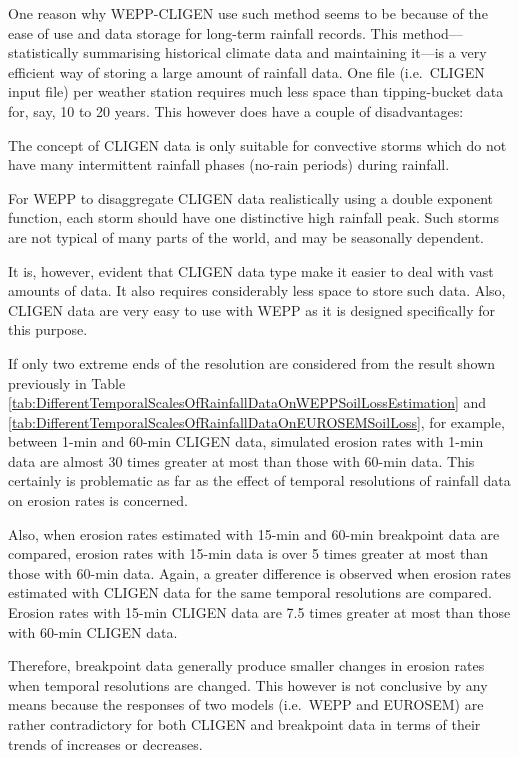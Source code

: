 One reason why WEPP-CLIGEN use such method seems to be because of the ease of
use and data storage for long-term rainfall records. This method---statistically
summarising historical climate data and maintaining it---is a very efficient way
of storing a large amount of rainfall data. One file (i.e.\ CLIGEN input file)
per weather station requires much less space than tipping-bucket data for, say,
10 to 20 years. This however does have a couple of disadvantages:
\begin{enumerate*}
  \item The concept of CLIGEN data is only suitable for convective storms which
do not have many intermittent rainfall phases (no-rain periods) during rainfall.
\medskip
  \item For WEPP to disaggregate CLIGEN data realistically using a double
exponent function, each storm should have one distinctive high rainfall peak.
Such storms are not typical of many parts of the world, and may be seasonally
dependent.
\end{enumerate*}
It is, however, evident that CLIGEN data type make it easier to deal with vast
amounts of data. It also requires considerably less space to store such data.
Also, CLIGEN data are very easy to use with WEPP as it is designed specifically
for this purpose.

If only two extreme ends of the resolution are considered from the result shown
previously in Table
\ref{tab:DifferentTemporalScalesOfRainfallDataOnWEPPSoilLossEstimation} and
\ref{tab:DifferentTemporalScalesOfRainfallDataOnEUROSEMSoilLoss}, for example,
between 1-min and 60-min CLIGEN data, simulated erosion rates with 1-min data
are almost 30 times greater at most than those with 60-min data. This certainly
is problematic as far as the effect of temporal resolutions of rainfall data on
erosion rates is concerned.

Also, when erosion rates estimated with 15-min and
60-min breakpoint data are compared, erosion rates with 15-min data is over 5
times greater at most than those with 60-min data. Again, a greater difference
is observed when erosion rates estimated with CLIGEN data for the same temporal
resolutions are compared. Erosion rates with 15-min CLIGEN data are 7.5 times
greater
at most than those with 60-min CLIGEN data.

Therefore, breakpoint data generally produce smaller changes in erosion rates
when temporal resolutions are changed. This however is not conclusive by any
means
because the responses of two models (i.e.\ WEPP and EUROSEM) are rather
contradictory for both CLIGEN and breakpoint data in terms of their trends of
increases or decreases.

